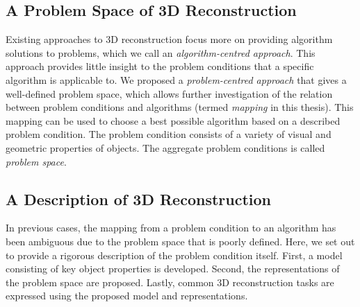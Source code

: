 \subsection{A Problem Space of 3D Reconstruction}
Existing approaches to 3D reconstruction focus more on providing algorithm solutions to problems, which we call an \textit{algorithm-centred approach}. This approach provides little insight to the problem conditions that a specific algorithm is applicable to. We proposed a \textit{problem-centred approach} that gives a well-defined problem space, which allows further investigation of the relation between problem conditions and algorithms (termed \textit{mapping} in this thesis). This mapping can be used to choose a best possible algorithm based on a described problem condition. The problem condition consists of a variety of visual and geometric properties of objects. The aggregate problem conditions is called \textit{problem space}.

\subsection{A Description of 3D Reconstruction}
In previous cases, the mapping from a problem condition to an algorithm has been ambiguous due to the problem space that is poorly defined. Here, we set out to provide a rigorous description of the problem condition itself. First, a model consisting of key object properties is developed. Second, the representations of the problem space are proposed. Lastly, common 3D reconstruction tasks are expressed using the proposed model and representations.



